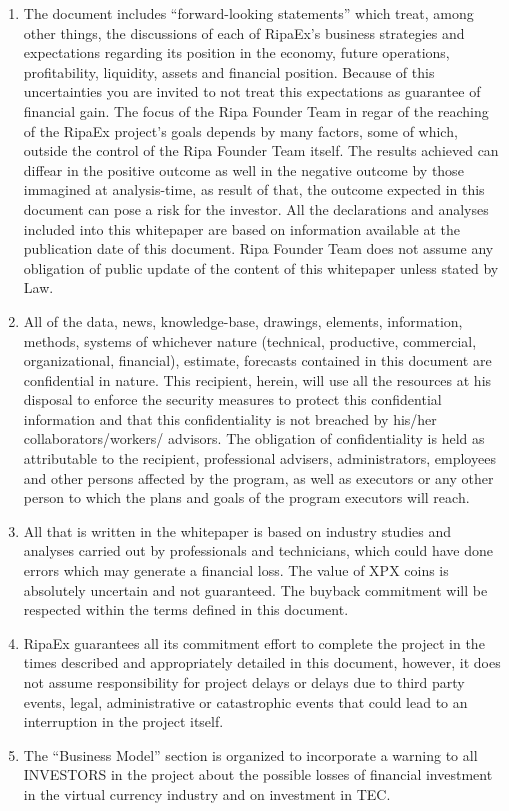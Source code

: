 \begin{scriptsize}
{\begin{enumerate}
			or completeness of any information, estimate and/or reporting of any such information or other third party
			sources.
			\item The document includes ``forward-looking statements'' which treat, among other things, the
			discussions of each of RipaEx’s business strategies and	expectations regarding its position in the economy, future
			operations, profitability, liquidity, assets and financial position. Because of this uncertainties you are
			invited to not treat this expectations as guarantee of financial gain. The focus of the Ripa Founder Team
			in regar of the reaching of the RipaEx project's goals depends by many factors, some of which, outside the
			control of the Ripa Founder Team itself. The results achieved can diffear in the positive outcome as well in 
			the negative outcome by those immagined at analysis-time, as result of that, the outcome expected in this
			document can pose a risk for the investor. All the declarations and analyses included into this whitepaper
			are based on information available at the publication date of this document. Ripa Founder Team does not 
			assume any obligation of public update of the content of this whitepaper unless stated by Law.
			\item All of the data, news, knowledge-base, drawings, elements, information, methods, systems of whichever
			nature (technical, productive, commercial, organizational, financial), estimate, forecasts contained in 
			this document are confidential in nature.
			This recipient, herein, will use all the resources at his disposal to enforce the security measures to protect
			this confidential information and that this confidentiality is not breached by his/her collaborators/workers/
			advisors.
			The obligation of confidentiality is held as attributable to the recipient, professional advisers, administrators, 
			employees and other persons affected by the program, as well as executors or any other person to which the plans 
			and goals of the program executors will reach.
			\item All that is written in the whitepaper is based on industry studies and analyses carried out by professionals 
			and technicians, which could have done errors which may generate a financial loss.
			The value of XPX coins is absolutely uncertain and not guaranteed. The buyback commitment will be respected within 
			the terms defined in this document.
			\item RipaEx guarantees all its commitment effort to complete the project in the times described
			and appropriately detailed in this document, however, it does not assume responsibility for project delays or
			delays due to third party events, legal, administrative or catastrophic events that could lead to an interruption in
			the project itself.
			\item The ``Business Model'' section is organized to incorporate a warning to all INVESTORS in the project
			about the possible losses of financial investment in the virtual currency industry and on investment in TEC.
		\end{enumerate}		
	}
\end{scriptsize}
